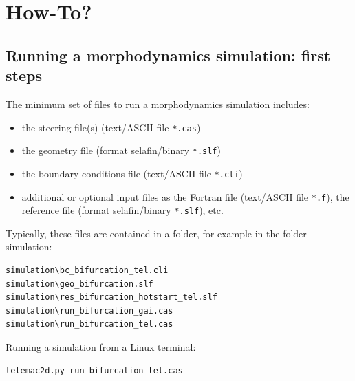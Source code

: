 \chapter[How-To?]{How-To?}
\label{chap:how-to}
\pagebreak
\section{Running a morphodynamics simulation: first steps}
The minimum set of files to run a morphodynamics simulation includes:
\begin{itemize}
\item the steering file(s) (text/ASCII file \texttt{*.cas})
\item the geometry file (format selafin/binary \texttt{*.slf})
\item the boundary conditions file (text/ASCII file \texttt{*.cli})
\item additional or optional input files as the Fortran file (text/ASCII file \texttt{*.f}), the reference file (format selafin/binary \texttt{*.slf}), etc.
\end{itemize}

Typically, these files are contained in a folder, for example in the folder simulation:
\begin{footnotesize}
\begin{verbatim}
simulation\bc_bifurcation_tel.cli
simulation\geo_bifurcation.slf
simulation\res_bifurcation_hotstart_tel.slf
simulation\run_bifurcation_gai.cas
simulation\run_bifurcation_tel.cas
\end{verbatim}
\end{footnotesize}
Running a simulation from a Linux terminal:
\begin{footnotesize}
\begin{verbatim}
telemac2d.py run_bifurcation_tel.cas
\end{verbatim}
\end{footnotesize}

